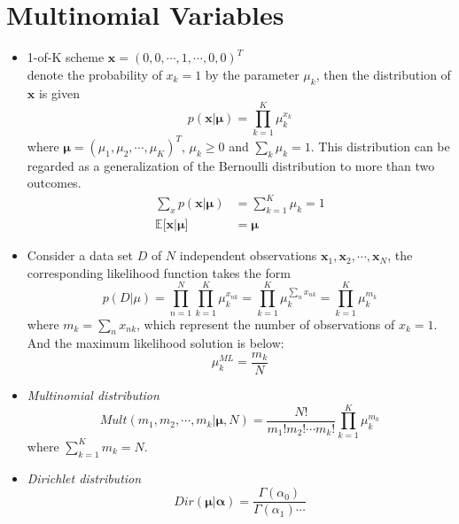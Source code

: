 \documentclass[12pt, a4paper]{article}
\newcommand{\E}{\mathbb{E}}
\begin{document}
    \section{Multinomial Variables}
    \begin{itemize}
        \item 1-of-K scheme $\bm{x}=(0,0,\cdots,1,\cdots,0,0)^T$\\
        denote the probability of $x_k=1$ by the parameter $\mu_k$, then the 
        distribution of $\bm{x}$ is given
        \begin{equation}
            p(\bm{x}|\bm{\mu})=\prod_{k=1}^K\mu_k^{x_k}
        \end{equation}
        where $\bm{\mu}=(\mu_1,\mu_2,\cdots,\mu_K)^T$, $\mu_k\ge 0$ and 
        $\sum_k\mu_k=1$. This distribution can be regarded as a generalization of 
        the Bernoulli distribution to more than two outcomes.
        \begin{align*}
            \sum_xp(\bm{x}|\bm{\mu})&=\sum_{k=1}^K\mu_k=1\\
            \E\lbrack\bm{x}|\bm{\mu}\rbrack&=\bm{\mu}
        \end{align*}
        \item Consider a data set $D$ of $N$ independent observations 
        $\bm{x}_1,\bm{x}_2,\cdots,\bm{x}_N$, the corresponding likelihood function
        takes the form
        \begin{equation*}
            p(D|\mu)=\prod_{n=1}^N\prod_{k=1}^K\mu_k^{x_{nk}}=\prod_{k=1}^K\mu_k^
            {\sum_n x_{nk}}=\prod_{k=1}^K\mu_k^{m_k}
        \end{equation*}
        where $m_k=\sum_n x_{nk}$, which represent the number of observations of 
        $x_k=1$. And the maximum likelihood solution is below:
        \begin{equation*}
            \mu_k^{ML}=\frac{m_k}{N}
        \end{equation*}
        \item \textit{Multinomial distribution}
        \begin{equation*}
            Mult(m_1,m_2,\cdots,m_k|\bm{\mu},N)=\frac{N!}{m_1!m_2!\cdots m_k!}
            \prod_{k=1}^K\mu_k^{m_k}
        \end{equation*}
        where $\sum_{k=1}^Km_k=N$.
        \item \textit{Dirichlet distribution}
        \begin{equation*}
            Dir(\bm{\mu}|\bm{\alpha})=\frac{\Gamma(\alpha_0)}{\Gamma(\alpha_1)\cdots
}
\end{equation*}
\end{itemize}
\end{document}
